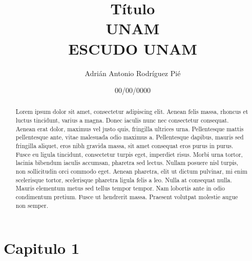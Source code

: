 \documentclass{report}
\title{
  {Título}\\
  {\large UNAM}\\
  {ESCUDO UNAM}
}
\author{Adrián Antonio Rodríguez Pié}
\date{00/00/0000}
\begin{document}
\maketitle

\begin{abstract}
Lorem ipsum dolor sit amet, consectetur adipiscing elit. Aenean felis massa, rhoncus et luctus tincidunt, varius a magna. Donec iaculis nunc nec consectetur consequat. Aenean erat dolor, maximus vel justo quis, fringilla ultrices urna. Pellentesque mattis pellentesque ante, vitae malesuada odio maximus a. Pellentesque dapibus, mauris sed fringilla aliquet, eros nibh gravida massa, sit amet consequat eros purus in purus. Fusce eu ligula tincidunt, consectetur turpis eget, imperdiet risus. Morbi urna tortor, lacinia bibendum iaculis accumsan, pharetra sed lectus. Nullam posuere nisl turpis, non sollicitudin orci commodo eget. Aenean pharetra, elit ut dictum pulvinar, mi enim scelerisque tortor, scelerisque pharetra ligula felis a leo. Nulla at consequat nulla. Mauris elementum metus sed tellus tempor tempor. Nam lobortis ante in odio condimentum pretium. Fusce ut hendrerit massa. Praesent volutpat molestie augue non semper.
\end{abstract}

\tableofcontents

\chapter{Capitulo 1}











\nocite{*}


\end{document}

